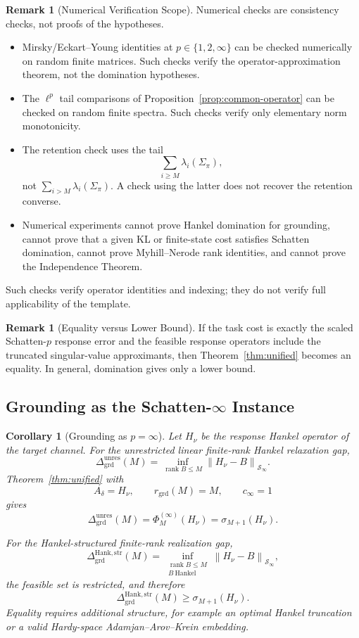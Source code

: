 \documentclass[12pt]{article}
\newtheorem{corollary}[theorem]{Corollary}
\theoremstyle{definition}
\newtheorem{remark}[theorem]{Remark}
\DeclareMathOperator{\rank}{rank}
\newcommand{\norm}[1]{\left\lVert#1\right\rVert}
\newcommand{\Dunres}{\Delta_{\mathrm{grd}}^{\mathrm{unres}}}
\newcommand{\DHankstr}{\Delta_{\mathrm{grd}}^{\mathrm{Hank,str}}}
\newcommand{\Sp}[1]{\mathcal S_{#1}}
\begin{document}
\begin{remark}[Numerical Verification Scope]
\label{rem:schatten-numerical-scope}
Numerical checks are consistency checks, not proofs of the hypotheses.
\begin{itemize}[leftmargin=1.6em]
\item Mirsky/Eckart--Young identities at $p\in\{1,2,\infty\}$ can be checked
numerically on random finite matrices.  Such checks verify the
operator-approximation theorem, not the domination hypotheses.
\item The $\ell^p$ tail comparisons of Proposition~\ref{prop:common-operator}
can be checked on random finite spectra.  Such checks verify only
elementary norm monotonicity.
\item The retention check uses the tail
\[
\sum_{i\ge M}
\lambda_i(\Sigma_\pi),
\]
not $\sum_{i>M}\lambda_i(\Sigma_\pi)$.  A check using the latter does
not recover the retention converse.
\item Numerical experiments cannot prove Hankel domination for grounding,
cannot prove that a given KL or finite-state cost satisfies Schatten
domination, cannot prove Myhill--Nerode rank identities, and cannot
prove the Independence Theorem.
\end{itemize}
Such checks verify operator identities and indexing; they do not verify full
applicability of the template.
\end{remark}

\begin{remark}[Equality versus Lower Bound]
\label{rem:unified-equality}
If the task cost is exactly the scaled Schatten-$p$ response error and the
feasible response operators include the truncated singular-value approximants,
then Theorem~\ref{thm:unified} becomes an equality.  In general, domination
gives only a lower bound.
\end{remark}

\subsection{Grounding as the Schatten-$\infty$ Instance}
\label{subsec:schatten-grounding}

\begin{corollary}[Grounding as $p=\infty$]
\label{cor:grd-schatten}
Let $H_\nu$ be the response Hankel operator of the target channel.  For the
unrestricted linear finite-rank Hankel relaxation gap,
\[
\Dunres(M)
=
\inf_{\rank B\le M}
\norm{H_\nu-B}_{\Sp{\infty}}.
\]
Theorem~\ref{thm:unified} with
\[
A_\delta=H_\nu,
\qquad
r_{\mathrm{grd}}(M)=M,
\qquad
c_\infty=1
\]
gives
\[
\Dunres(M)
=
\Phi^{(\infty)}_M(H_\nu)
=
\sigma_{M+1}(H_\nu).
\]

For the Hankel-structured finite-rank realization gap,
\[
\DHankstr(M)
=
\inf_{\substack{
\rank B\le M\\
B\ \text{Hankel}
}}
\norm{H_\nu-B}_{\Sp{\infty}},
\]
the feasible set is restricted, and therefore
\[
\DHankstr(M)
\ge
\sigma_{M+1}(H_\nu).
\]
Equality requires additional structure, for example an optimal Hankel
truncation or a valid Hardy-space Adamjan--Arov--Krein embedding.
\end{corollary}
\end{document}
